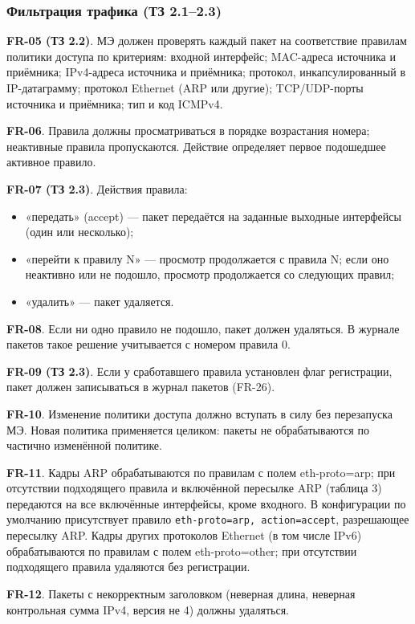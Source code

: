 \documentclass[13pt,a4paper,final]{article}
\begin{document}
	\subsubsection{Фильтрация трафика (ТЗ 2.1–2.3)}
	
	\textbf{FR-05 (ТЗ 2.2)}. МЭ должен проверять каждый пакет на соответствие правилам политики доступа по критериям: входной интерфейс; MAC-адреса источника и приёмника; IPv4-адреса источника и приёмника; протокол, инкапсулированный в IP-датаграмму; протокол Ethernet (ARP или другие); TCP/UDP-порты источника и приёмника; тип и код ICMPv4.
	
	\textbf{FR-06}. Правила должны просматриваться в порядке возрастания номера; неактивные правила пропускаются. Действие определяет первое подошедшее активное правило.
	
	\textbf{FR-07 (ТЗ 2.3)}. Действия правила:
	\begin{itemize}
		\item «передать» (accept) — пакет передаётся на заданные выходные интерфейсы (один или несколько);
		\item «перейти к правилу N» — просмотр продолжается с правила N; если оно неактивно или не подошло, просмотр продолжается со следующих правил;
		\item «удалить» — пакет удаляется.
	\end{itemize}
	
	\textbf{FR-08}. Если ни одно правило не подошло, пакет должен удаляться. В журнале пакетов такое решение учитывается с номером правила 0.
	
	\textbf{FR-09 (ТЗ 2.3)}. Если у сработавшего правила установлен флаг регистрации, пакет должен записываться в журнал пакетов (FR-26).
	
	\textbf{FR-10}. Изменение политики доступа должно вступать в силу без перезапуска МЭ. Новая политика применяется целиком: пакеты не обрабатываются по частично изменённой политике.
	
	\textbf{FR-11}. Кадры ARP обрабатываются по правилам с полем eth-proto=arp; при отсутствии подходящего правила и включённой пересылке ARP (таблица 3) передаются на все включённые интерфейсы, кроме входного. В конфигурации по умолчанию присутствует правило \texttt{eth-proto=arp, action=accept}, разрешающее пересылку ARP. Кадры других протоколов Ethernet (в том числе IPv6) обрабатываются по правилам с полем eth-proto=other; при отсутствии подходящего правила удаляются без регистрации.
	
	\textbf{FR-12}. Пакеты с некорректным заголовком (неверная длина, неверная контрольная сумма IPv4, версия не 4) должны удаляться.
	
\end{document}
